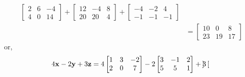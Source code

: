 \documentclass{ximera}
\begin{document}
\begin{example}
\begin{align*}
                                      \begin{bmatrix}
                                        2&6&-4\\
                                        4&0&14
                                      \end{bmatrix}
                                             +
                                             \begin{bmatrix}
                                               12&-4&8\\
                                               20&20&4
                                             \end{bmatrix}
                                                      +
                                                      \begin{bmatrix}
                                                        -4&-2&4\\
                                                        -1&-1&-1
                                                      \end{bmatrix}\\
                                    &=
                                      \begin{bmatrix}
                                        10&0&8\\
                                        23&19&17
                                      \end{bmatrix}
  \end{align*}
  or,
  \begin{align*}
    4\mathbf{x}-2\mathbf{y}+3\mathbf{z}&=
                                   4
                                   \begin{bmatrix}
                                     1&3&-2\\
                                     2&0&7
                                   \end{bmatrix}
                                          -2
                                          \begin{bmatrix}
                                            3&-1&2\\
                                            5&5&1
                                          \end{bmatrix}
                                                 +3
                                                 \begin{bmatrix}

\end{bmatrix}
\end{align*}
\end{example}
\end{document}
